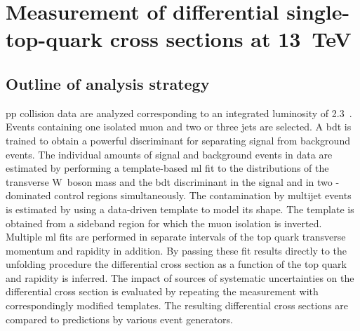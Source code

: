 \chapter{Measurement of differential single-top-quark cross sections at 13~TeV}
\label{ch:diff13}



\section{Outline of analysis strategy}

\Acrlong{pp} collision data are analyzed corresponding to an integrated luminosity of 2.3~\invfb. Events containing one isolated muon and two or three jets are selected. A \gls{bdt} is trained to obtain a powerful discriminant for separating signal from background events. The individual amounts of signal and background events in data are estimated by performing a template-based \gls{ml} fit to the distributions of the transverse W~boson mass and the \gls{bdt} discriminant in the signal and in two \ttbar-dominated control regions simultaneously. The contamination by multijet events is estimated by using a data-driven template to model its shape. The template is obtained from a sideband region for which the muon isolation is inverted. Multiple \gls{ml} fits are performed in separate intervals of the top quark transverse momentum and rapidity in addition. By passing these fit results directly to the unfolding procedure the differential cross section as a function of the top quark \pt and rapidity is inferred. The impact of sources of systematic uncertainties on the differential cross section is evaluated by repeating the measurement with correspondingly modified templates. The resulting differential cross sections are compared to predictions by various event generators.


